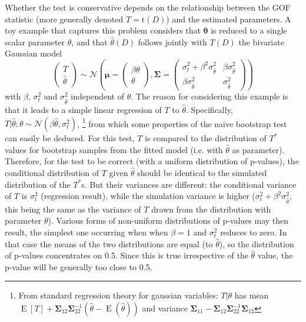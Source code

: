 \documentclass[a4paper]{article}\usepackage[]{graphicx}\usepackage[]{color}
\newcommand{\data}{\ensuremath{D}}
\newcommand{\tfn}{\ensuremath{\mathrm{t}}}
\newcommand{\bth}{\ensuremath{\boldsymbol{\theta}}}
\newcommand{\bSigma}{\ensuremath{\boldsymbol{\Sigma}}}
\DeclareMathOperator{\Esp}{E}
\begin{document}
Whether the test is conservative depends on the relationship between the GOF statistic (more generally denoted $T=\tfn(D)$) and the estimated parameters. A toy example that captures this problem considers that $\bth$ is reduced to a single scalar parameter $\theta$, and that $\hat{\theta}(\data)$ follows jointly with $T(\data)$ the bivariate Gaussian model \begin{equation*}
	\begin{pmatrix}T\\  \hat{\theta}\end{pmatrix} \sim \mathcal{N}\left(\boldsymbol{\mu}=\begin{pmatrix}\beta \theta\\ \theta\end{pmatrix}, \bSigma=\begin{pmatrix}
	\sigma^2_t+\beta^2 \sigma^2_{\hat{\theta}}& \beta \sigma^2_{\hat{\theta}}\\
	\beta \sigma^2_{\hat{\theta}}& \sigma^2_{\hat{\theta}}
	\end{pmatrix}\right)
\end{equation*}
with $\beta$, $\sigma^2_t$ and $\sigma^2_{\hat{\theta}}$ independent of $\theta$. The reason for considering this example is that it leads to a simple linear regression of $T$ to $\hat{\theta}$. Specifically, $T|\hat{\theta}; \theta \sim \mathcal{N}(\beta\hat{\theta},\sigma^2_t)$,%
%
\footnote{From standard regression theory for gaussian variables: $T|\theta$ has mean $\Esp[T]+\bSigma_{12} \bSigma_{22}^{-1}(\hat{\theta}-\Esp(\hat{\theta}))$ and variance $\bSigma_{11}-\bSigma_{12} \bSigma_{22}^{-1}\bSigma_{12}$} %
%
from which some properties of the naive bootstrap test can easily be deduced. For this test, $T$ is compared to the distribution of $T^*$ values for bootstrap samples from the fitted model (i.e. with $\hat{\theta}$ as parameter). Therefore, for the test to be correct (with a uniform distribution of p-values), the conditional distribution of $T$ given $\hat{\theta}$ should be identical to the simulated distribution of the $T^*$s. But their variances are different: the conditional variance of $T$ is $\sigma^2_t$ (regression result), while the simulation variance is higher ($\sigma^2_t+\beta^2 \sigma^2_{\hat{\theta}}$, this being the same as the variance of $T$ drawn from the distribution with parameter $\theta$).  Various forms of non-uniform distributions of p-values may then result, the simplest one occurring when when $\beta=1$ and $\sigma^2_t$ reduces to zero. In that case the means of the two distributions are equal (to $\hat{\theta}$), so the distribution of p-values concentrates on 0.5. Since this is true irrespective of the $\hat{\theta}$ value, the p-value will be generally too close to 0.5.
\end{document}
